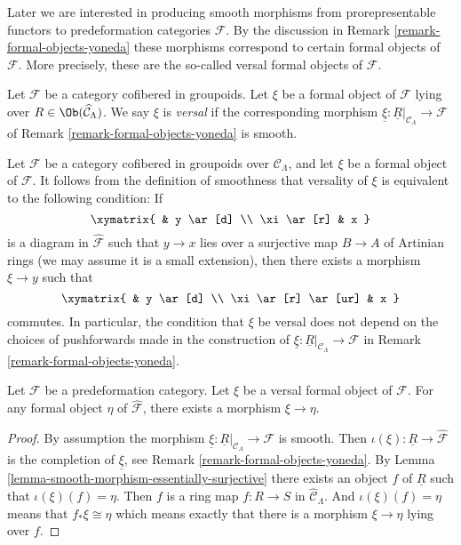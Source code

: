 \noindent
Later we are interested in producing smooth morphisms from
prorepresentable functors to predeformation categories $\mathcal{F}$.
By the discussion in
Remark \ref{remark-formal-objects-yoneda}
these morphisms correspond to certain formal objects of $\mathcal{F}$.
More precisely, these are the so-called versal formal objects of $\mathcal{F}$.

\begin{definition}
\label{definition-versal}
Let $\mathcal{F}$ be a category cofibered in groupoids.  Let $\xi$ be a formal
object of $\mathcal{F}$ lying over $R \in \Ob(\widehat{\mathcal{C}}_\Lambda)$.
We say $\xi$ is {\it versal} if the corresponding morphism
$\underline{\xi}: \underline{R}|_{\mathcal{C}_\Lambda} \to \mathcal{F}$
of Remark \ref{remark-formal-objects-yoneda} is smooth.
\end{definition}

\begin{remark}
\label{remark-versal-object}
Let $\mathcal{F}$ be a category cofibered in groupoids over $\mathcal
C_\Lambda$, and let $\xi$ be a formal object of $\mathcal{F}$.  It follows
from the definition of smoothness that versality of $\xi$ is equivalent to the
following condition: If
$$
\xymatrix{
& y \ar[d] \\
\xi \ar[r] & x
}
$$
is a diagram in $\widehat{\mathcal{F}}$ such that $y \to x$ lies over a
surjective map $B \to A$ of Artinian rings (we may assume it is a small
extension),  then there exists a morphism $\xi \to y$ such that
$$
\xymatrix{
& y \ar[d] \\
\xi \ar[r] \ar[ur] & x
}
$$
commutes. In particular, the condition that $\xi$ be versal does not depend on
the choices of pushforwards made in the construction of
$\underline{\xi} : \underline{R}|_{\mathcal{C}_\Lambda} \to \mathcal{F}$ in
Remark \ref{remark-formal-objects-yoneda}.
\end{remark}

\begin{lemma}
\label{lemma-versal-object-quasi-initial}
Let $\mathcal{F}$ be a predeformation category.
Let $\xi$ be a versal formal object of $\mathcal{F}$.
For any formal object $\eta$ of $\widehat{\mathcal{F}}$,
there exists a morphism $\xi \to \eta$.
\end{lemma}

\begin{proof}
By assumption the morphism
$\underline{\xi} : \underline{R}|_{\mathcal{C}_\Lambda} \to \mathcal{F}$
is smooth. Then
$\iota(\xi) : \underline{R} \to \widehat{\mathcal{F}}$
is the completion of $\underline{\xi}$, see
Remark \ref{remark-formal-objects-yoneda}.
By
Lemma \ref{lemma-smooth-morphism-essentially-surjective}
there exists an object $f$ of $\underline{R}$ such that
$\iota(\xi)(f) = \eta$. Then $f$ is
a ring map $f : R \to S$ in $\widehat{\mathcal{C}}_\Lambda$. And
$\iota(\xi)(f) = \eta$ means that
$f_*\xi \cong \eta$ which means exactly that there is a morphism
$\xi \to \eta$ lying over $f$.
\end{proof}





